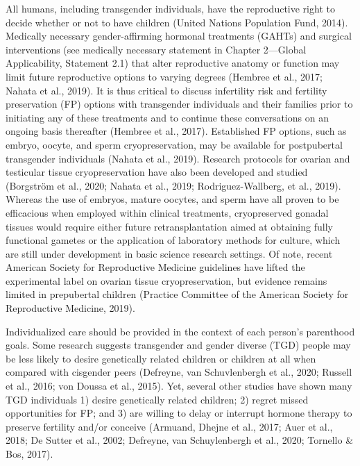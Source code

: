 \documentclass[
]{book}
\begin{document}
All humans, including transgender individuals,
have the reproductive right to decide whether
or not to have children (United Nations
Population Fund, 2014). Medically necessary
gender-affirming hormonal treatments (GAHTs)
and surgical interventions (see medically necessary statement in Chapter 2---Global Applicability,
Statement 2.1) that alter reproductive anatomy
or function may limit future reproductive options
to varying degrees (Hembree et al., 2017; Nahata
et al., 2019). It is thus critical to discuss infertility risk and fertility preservation (FP) options
with transgender individuals and their families
prior to initiating any of these treatments and
to continue these conversations on an ongoing
basis thereafter (Hembree et al., 2017). Established
FP options, such as embryo, oocyte, and sperm
cryopreservation, may be available for postpubertal transgender individuals (Nahata et al.,
2019). Research protocols for ovarian and testicular tissue cryopreservation have also been
developed and studied (Borgström et al., 2020;
Nahata et al., 2019; Rodriguez-Wallberg, et al.,
2019). Whereas the use of embryos, mature
oocytes, and sperm have all proven to be efficacious when employed within clinical treatments, cryopreserved gonadal tissues would
require either future retransplantation aimed at
obtaining fully functional gametes or the application of laboratory methods for culture, which
are still under development in basic science
research settings. Of note, recent American
Society for Reproductive Medicine guidelines
have lifted the experimental label on ovarian
tissue cryopreservation, but evidence remains
limited in prepubertal children (Practice
Committee of the American Society for
Reproductive Medicine, 2019).

Individualized care should be provided in the
context of each person's parenthood goals. Some
research suggests transgender and gender diverse
(TGD) people may be less likely to desire genetically related children or children at all when
compared with cisgender peers (Defreyne, van
Schuvlenbergh et al., 2020; Russell et al., 2016;
von Doussa et al., 2015). Yet, several other studies
have shown many TGD individuals 1) desire
genetically related children; 2) regret missed
opportunities for FP; and 3) are willing to delay
or interrupt hormone therapy to preserve fertility
and/or conceive (Armuand, Dhejne et al., 2017;
Auer et al., 2018; De Sutter et al., 2002; Defreyne,
van Schuylenbergh et al., 2020; Tornello \&
Bos, 2017).
\end{document}
